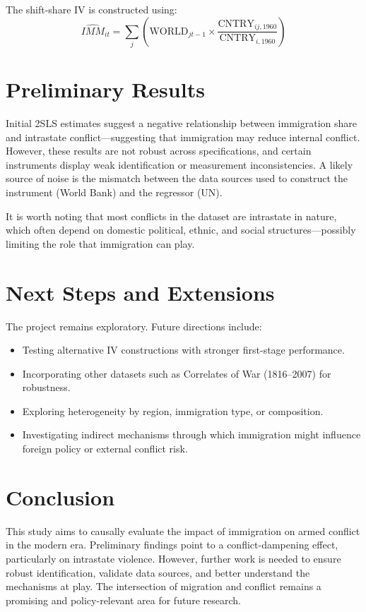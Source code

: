 \documentclass[12pt]{article}
\begin{document}
The shift-share IV is constructed using:
\[
\widehat{IMM}_{it} = \sum_j \left( \text{WORLD}_{jt-1} \times \frac{\text{CNTRY}_{ij,1960}}{\text{CNTRY}_{i,1960}} \right)
\]

\section*{Preliminary Results}

Initial 2SLS estimates suggest a negative relationship between immigration share and intrastate conflict—suggesting that immigration may reduce internal conflict. However, these results are not robust across specifications, and certain instruments display weak identification or measurement inconsistencies. A likely source of noise is the mismatch between the data sources used to construct the instrument (World Bank) and the regressor (UN).

It is worth noting that most conflicts in the dataset are intrastate in nature, which often depend on domestic political, ethnic, and social structures—possibly limiting the role that immigration can play.

\section*{Next Steps and Extensions}

The project remains exploratory. Future directions include:

\begin{itemize}
    \item Testing alternative IV constructions with stronger first-stage performance.
    \item Incorporating other datasets such as Correlates of War (1816–2007) for robustness.
    \item Exploring heterogeneity by region, immigration type, or composition.
    \item Investigating indirect mechanisms through which immigration might influence foreign policy or external conflict risk.
\end{itemize}

\section*{Conclusion}

This study aims to causally evaluate the impact of immigration on armed conflict in the modern era. Preliminary findings point to a conflict-dampening effect, particularly on intrastate violence. However, further work is needed to ensure robust identification, validate data sources, and better understand the mechanisms at play. The intersection of migration and conflict remains a promising and policy-relevant area for future research.
\end{document}
